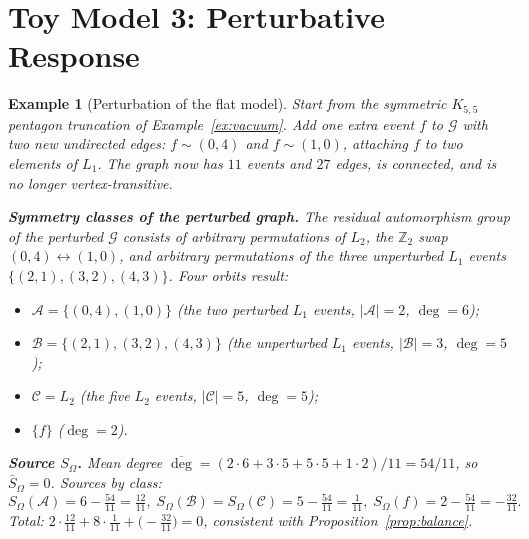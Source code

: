 \documentclass[12pt]{article}
\newtheorem{example}[theorem]{Example}
\newcommand{\Gcal}{\mathcal{G}}
\begin{document}
\section{Toy Model 3: Perturbative Response}\label{sec:perturbation}

\begin{example}[Perturbation of the flat model]\label{ex:perturb}
Start from the symmetric $K_{5,5}$ pentagon truncation of Example~\ref{ex:vacuum}. Add one extra event $f$ to $\Gcal$ with two new undirected edges: $f \sim (0,4)$ and $f \sim (1,0)$, attaching $f$ to two elements of $L_1$. The graph now has $11$ events and $27$ edges, is connected, and is no longer vertex-transitive.

\textbf{Symmetry classes of the perturbed graph.} The residual automorphism group of the perturbed $\Gcal$ consists of arbitrary permutations of $L_2$, the $\mathbb{Z}_2$ swap $(0,4) \leftrightarrow (1,0)$, and arbitrary permutations of the three unperturbed $L_1$ events $\{(2,1),(3,2),(4,3)\}$. Four orbits result:
\begin{itemize}
    \item $\mathcal{A} = \{(0,4),(1,0)\}$ (the two perturbed $L_1$ events, $|\mathcal{A}|=2$, $\deg = 6$);
    \item $\mathcal{B} = \{(2,1),(3,2),(4,3)\}$ (the unperturbed $L_1$ events, $|\mathcal{B}|=3$, $\deg = 5$);
    \item $\mathcal{C} = L_2$ (the five $L_2$ events, $|\mathcal{C}|=5$, $\deg = 5$);
    \item $\{f\}$ ($\deg = 2$).
\end{itemize}

\textbf{Source $S_\Omega$.} Mean degree $\overline{\deg} = (2\cdot 6 + 3\cdot 5 + 5\cdot 5 + 1\cdot 2)/11 = 54/11$, so $\bar S_\Omega = 0$. Sources by class:
\[
    S_\Omega(\mathcal{A}) = 6 - \tfrac{54}{11} = \tfrac{12}{11}, \;
    S_\Omega(\mathcal{B}) = S_\Omega(\mathcal{C}) = 5 - \tfrac{54}{11} = \tfrac{1}{11}, \;
    S_\Omega(f) = 2 - \tfrac{54}{11} = -\tfrac{32}{11}.
\]
Total: $2\cdot\tfrac{12}{11} + 8\cdot\tfrac{1}{11} + \bigl(-\tfrac{32}{11}\bigr) = 0$, consistent with Proposition~\ref{prop:balance}.


\end{example}
\end{document}
